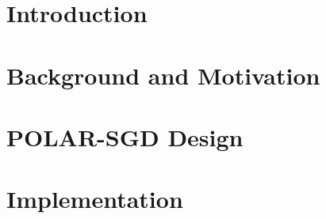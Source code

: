 \documentclass{article}
\theoremstyle{plain}
\theoremstyle{definition}
\theoremstyle{remark}
\newcommand{\sysname}{POLAR-SGD\xspace}
\begin{document}
\begin{abstract}
We evaluated POLAR-SGD on models including LLaMA-2 7B on a cluster of 32 A100 GPUs, emulating real Cross-DC conditions (20 Gb/s bandwidth, 50ms latency) via network throttling. Experiments show that under these low-bandwidth, high-latency network conditions, POLAR-SGD achieves a \textbf{1.87×} improvement in training throughput compared to a standard DP+PP baseline, reducing GPU idle time due to communication from 34\% to 7\% (a 4.8× reduction). Critically, this acceleration comes with no loss in model quality; POLAR-SGD's convergence curve is nearly identical to the synchronous baseline, which offers a practical and efficient solution for Cross-DC large-scale LLM training.
\end{abstract}

    \section{Introduction}

    

    \section{Background and Motivation}

    


    \section{\sysname Design}
    

    \section{Implementation}
    \label{implementation}
\end{document}
